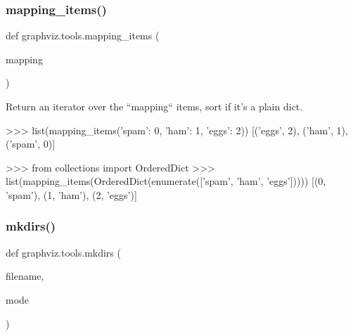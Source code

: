 \subsubsection{\texorpdfstring{mapping\+\_\+items()}{mapping\_items()}}
{\footnotesize\ttfamily def graphviz.\+tools.\+mapping\+\_\+items (\begin{DoxyParamCaption}\item[{}]{mapping }\end{DoxyParamCaption})}

\begin{DoxyVerb}Return an iterator over the ``mapping`` items, sort if it's a plain dict.

>>> list(mapping_items({'spam': 0, 'ham': 1, 'eggs': 2}))
[('eggs', 2), ('ham', 1), ('spam', 0)]

>>> from collections import OrderedDict
>>> list(mapping_items(OrderedDict(enumerate(['spam', 'ham', 'eggs']))))
[(0, 'spam'), (1, 'ham'), (2, 'eggs')]
\end{DoxyVerb}
 \mbox{\label{namespacegraphviz_1_1tools_af1a59f0a7eb40eb2ec66666aedcf9183}} 
\subsubsection{\texorpdfstring{mkdirs()}{mkdirs()}}
{\footnotesize\ttfamily def graphviz.\+tools.\+mkdirs (\begin{DoxyParamCaption}\item[{}]{filename,  }\item[{}]{mode }\end{DoxyParamCaption})}


